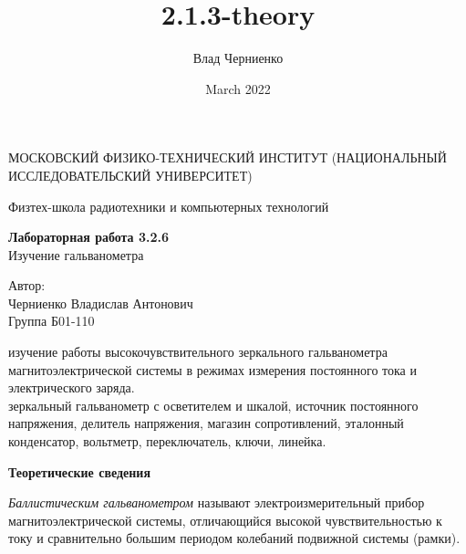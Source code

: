 \documentclass[a4paper, 12pt]{article}
\title{2.1.3-theory}
\author{Влад Черниенко}
\date{March 2022}
\begin{document}
    \begin{titlepage}
    
        \begin{center}
            {\large МОСКОВСКИЙ ФИЗИКО-ТЕХНИЧЕСКИЙ ИНСТИТУТ (НАЦИОНАЛЬНЫЙ ИССЛЕДОВАТЕЛЬСКИЙ УНИВЕРСИТЕТ)}
        \end{center}
        \begin{center}
            {\large Физтех-школа радиотехники и компьютерных технологий}
        \end{center}
        
        \vspace{4.5cm}
        
        {\huge
            \begin{center}
                {\bf Лабораторная работа 3.2.6} \\
                Изучение гальванометра
            \end{center}
        }
        
        \vspace{12cm}
        
        \begin{flushright}
            {\LARGE Автор: \\ Черниенко Владислав Антонович \\ \vspace{0.2cm} Группа Б01-110}
        \end{flushright}
        
    \end{titlepage}
    
    
     изучение работы высокочувствительного зеркального гальванометра магнитоэлектрической системы в режимах измерения постоянного тока и электрического заряда. \\
    
     зеркальный гальванометр с осветителем и шкалой, источник постоянного напряжения, делитель напряжения, магазин сопротивлений, эталонный конденсатор, вольтметр, переключатель, ключи, линейка. \\
    
    \begin{flushleft}
        {\Large {\bf Теоретические сведения}}
    \end{flushleft}
    
    \textit{Баллистическим гальванометром} называют электроизмерительный прибор магнитоэлектрической системы, отличающийся высокой чувствительностью к току и сравнительно большим периодом колебаний подвижной системы (рамки). \\
    
\end{document}
